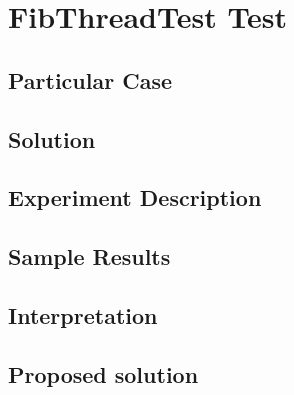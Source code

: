 \section{\textbf{FibThreadTest Test}}
\subsection{Particular Case}
\par
\par
\subsection{Solution}
\par
\par
\subsection{Experiment Description}
\par
\par
\subsection{Sample Results}
\par
\par
\subsection{Interpretation}
\par
\par
\subsection{Proposed solution}
\par
\par
